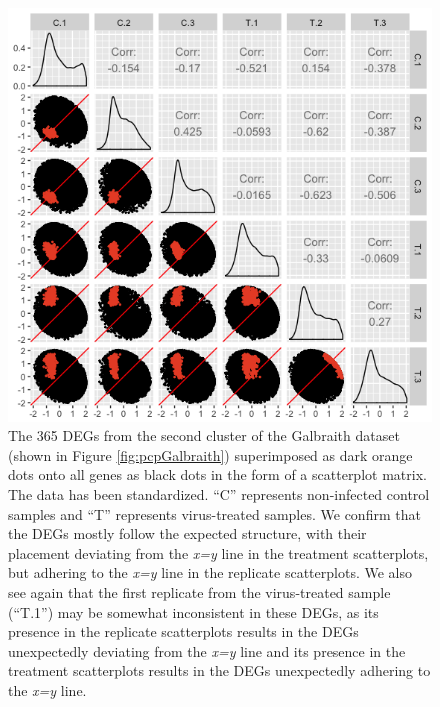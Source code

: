 \documentclass[11pt,a4paper,oldfontcommands,openany]{memoir}
\numberwithin{equation}{section} %
\begin{document}
\begin{figure}[H]
\begin{framed}
  \includegraphics[width=\textwidth]{Images/GalbraithClust2SM}
\end{framed}
  \caption{The 365 DEGs from the second cluster of the Galbraith dataset (shown in Figure \ref{fig:pcpGalbraith}) superimposed as dark orange dots onto all genes as black dots in the form of a scatterplot matrix. The data has been standardized. ``C'' represents non-infected control samples and ``T'' represents virus-treated samples. We confirm that the DEGs mostly follow the expected structure, with their placement deviating from the \textit{x=y} line in the treatment scatterplots, but adhering to the \textit{x=y} line in the replicate scatterplots. We also see again that the first replicate from the virus-treated sample (``T.1'') may be somewhat inconsistent in these DEGs, as its presence in the replicate scatterplots results in the DEGs unexpectedly deviating from the \textit{x=y} line and its presence in the treatment scatterplots results in the DEGs unexpectedly adhering to the \textit{x=y} line.}
  \label{fig:GalbraithClust2SM}
\end{figure}
\end{document}
